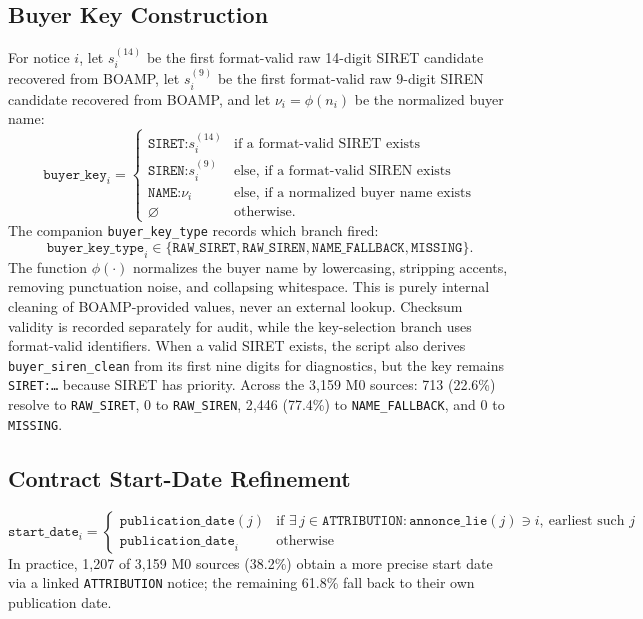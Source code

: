 \documentclass[11pt]{article}
\begin{document}
\subsection{Buyer Key Construction}
\label{sec:buyerkey}
For notice $i$, let $s_i^{(14)}$ be the first format-valid raw 14-digit SIRET
candidate recovered from BOAMP, let $s_i^{(9)}$ be the first format-valid raw
9-digit SIREN candidate recovered from BOAMP, and let $\nu_i=\phi(n_i)$ be the
normalized buyer name:
\begin{equation}
\texttt{buyer\_key}_i =
\begin{cases}
\texttt{SIRET:}s_i^{(14)} & \text{if a format-valid SIRET exists} \\
\texttt{SIREN:}s_i^{(9)} & \text{else, if a format-valid SIREN exists} \\
\texttt{NAME:}\nu_i & \text{else, if a normalized buyer name exists} \\
\varnothing & \text{otherwise.}
\end{cases}
\end{equation}
The companion \texttt{buyer\_key\_type} records which branch fired:
\[
\texttt{buyer\_key\_type}_i \in
\{\texttt{RAW\_SIRET},\texttt{RAW\_SIREN},
\texttt{NAME\_FALLBACK},\texttt{MISSING}\}.
\]
The function $\phi(\cdot)$ normalizes the buyer name by lowercasing, stripping
accents, removing punctuation noise, and collapsing whitespace. This is purely
internal cleaning of BOAMP-provided values, never an external lookup. Checksum
validity is recorded separately for audit, while the key-selection branch uses
format-valid identifiers. When a valid SIRET exists, the script also derives
\texttt{buyer\_siren\_clean} from its first nine digits for diagnostics, but
the key remains \texttt{SIRET:\ldots} because SIRET has priority. Across the
3{,}159 M0 sources: 713 (22.6\%) resolve to \texttt{RAW\_SIRET}, 0 to
\texttt{RAW\_SIREN}, 2{,}446 (77.4\%) to \texttt{NAME\_FALLBACK}, and 0 to
\texttt{MISSING}.

\subsection{Contract Start-Date Refinement}
\begin{equation}
\texttt{start\_date}_i =
\begin{cases}
\texttt{publication\_date}(j) & \text{if } \exists\, j \in \texttt{ATTRIBUTION} : \texttt{annonce\_lie}(j) \ni i,\ \text{earliest such } j \\
\texttt{publication\_date}_i & \text{otherwise}
\end{cases}
\end{equation}
In practice, 1{,}207 of 3{,}159 M0 sources (38.2\%) obtain a more precise
start date via a linked \texttt{ATTRIBUTION} notice; the remaining 61.8\%
fall back to their own publication date.
\end{document}
